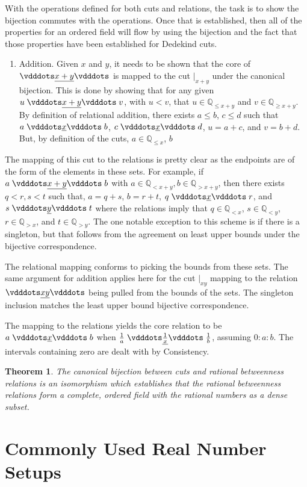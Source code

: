 \documentclass[12pt]{article}
\newtheorem{theorem}{Theorem}[section]
\newcommand{\qcut}[2][x]{\ensuremath{\mathbb{Q}_{#2 #1}}}
\newcommand{\qlt}[1][x]{\qcut[#1]{<}}
\newcommand{\qgt}[1][x]{\qcut[#1]{>}}
\newcommand{\qgeq}[1][x]{\qcut[#1]{\geq}}
\newcommand{\qleq}[1][x]{\qcut[#1]{\leq}}
\newcommand{\cut}[1][x]{{\vert}_{#1} }
\newcommand{\yrel}{\xrel[y]}
\begin{document}
With the operations defined for both cuts and relations, the task is to show the bijection commutes with the operations. Once that is established, then all of the properties for an ordered field will flow by using the bijection and the fact that those properties have been established for Dedekind cuts. 

\begin{enumerate}
    \item Addition. Given $x$ and $y$, it needs to be shown that the core of $\xrel[x+y]$ is mapped to the cut $\cut[x+y]$ under the canonical bijection. This is done by showing that for any given $u \xrel[x+y] v$, with $u < v$, that $u \in \qleq[x+y]$ and $v \in \qgeq[x+y]$. By definition of relational addition, there exists $a \leq b$, $c \leq d$ such that $a \xrel b$, $c\xrel d$, $u = a+c$, and $v = b+d$. But, by definition of the cuts, $a \in \qleq$, $b $
\end{enumerate}
The mapping of this cut to the relations is pretty clear as the endpoints are of the form of the elements in these sets. For example, if $a \xrel[x+y] b$ with $ a \in \qlt[x+y], b \in \qgt[x+y]$, then there exists $q <r, s < t$ such that, $a = q+s$, $b = r+t$, $q \xrel r$,  and $s \yrel t$ where the relations imply that  $q \in \qlt$, $s \in \qlt[y]$, $r \in \qgt$, and $t \in \qgt[y]$.  The one notable exception to this scheme is if there is a singleton, but that follows from the agreement on least upper bounds under the bijective correspondence. 

The relational mapping conforms to picking the bounds from these sets. 
The same argument for addition applies here for the cut $\cut[xy]$ mapping to the relation $\xrel[xy]$ being pulled from the bounds of the sets. The singleton inclusion matches the least upper bound bijective correspondence. 

The mapping to the relations yields the core relation to be $a \xrel b$ when $\frac{1}{a} \xrel[\frac{1}{x}] \frac{1}{b}$, assuming $0:a:b$. The intervals containing zero are dealt with by Consistency. 


\begin{theorem}
The canonical bijection between cuts and rational betweenness relations is an isomorphism which establishes that the rational betweenness relations form a complete, ordered field with the rational numbers as a dense subset. 
\end{theorem}

\section{Commonly Used Real Number Setups}
\end{document}
